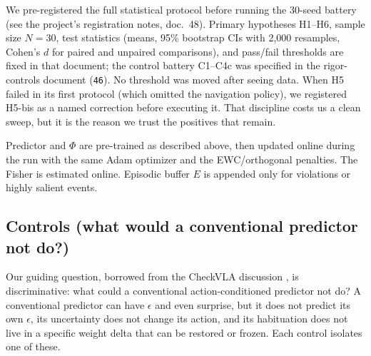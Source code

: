\documentclass[11pt,a4paper]{article}
\begin{document}
We pre-registered the full statistical protocol before running the 30-seed battery (see the project's registration notes, doc.~48). Primary hypotheses H1--H6, sample size $N=30$, test statistics (means, 95\% bootstrap CIs with 2,000 resamples, Cohen's $d$ for paired and unpaired comparisons), and pass/fail thresholds are fixed in that document; the control battery C1--C4c was specified in the rigor-controls document (\texttt{46}). No threshold was moved after seeing data. When H5 failed in its first protocol (which omitted the navigation policy), we registered H5-bis as a named correction before executing it. That discipline costs us a clean sweep, but it is the reason we trust the positives that remain.

Predictor and $\Phi$ are pre-trained as described above, then updated online during the run with the same Adam optimizer and the EWC/orthogonal penalties. The Fisher is estimated online. Episodic buffer $E$ is appended only for violations or highly salient events.

\subsection{Controls (what would a conventional predictor not do?)}

Our guiding question, borrowed from the CheckVLA discussion \cite{checkvla2026}, is discriminative: what could a conventional action-conditioned predictor not do? A conventional predictor can have $\epsilon$ and even surprise, but it does not predict its own $\epsilon$, its uncertainty does not change its action, and its habituation does not live in a specific weight delta that can be restored or frozen. Each control isolates one of these.
\end{document}
